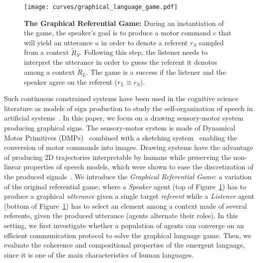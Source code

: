 \begin{figure}[h!]
\centering 
\texttt{[image: curves/graphical\_language\_game.pdf]}
\caption{\textbf{The Graphical Referential Game:} During an instantiation of the game, the speaker's goal is to produce a motor command $c$ that will yield an utterance $u$ in order to denote a referent $r_S$ sampled from a context $\tilde{R}_S$. Following this step, the listener needs to interpret the utterance in order to guess the referent it denotes among a context $\tilde{R}_L$. The game is a success if the listener and the speaker agree on the referent ($r_L\equiv r_S$).}%
\label{fig:1}
\end{figure}

Such continuous constrained systems have been used in the cognitive science literature as models of sign production to study the self-organization of speech in artificial systems~\citep{deBoer2000selforganization,oudeyer2006selforganization,MOULINFRIER20155}. 
In this paper, we focus on a drawing sensory-motor system producing graphical signs. The sensory-motor system is made of Dynamical Motor Primitives (DMPs)~\citep{schaal2006dynamic} combined with a sketching system~\citep{Mihai2021DifferentiableDA} enabling the conversion of motor commands into images.  Drawing systems have the advantage of producing 2D trajectories interpretable by humans while preserving the non-linear properties of speech models, which were shown to ease the discretization of the produced signals~\citep{STEVENS19893,MOULINFRIER20155}. We introduce the \textit{Graphical Referential Game}: a variation of the original referential game, where a \textit{Speaker} agent (top of Figure~\ref{fig:1}) has to produce a graphical \textit{utterance} given a single target \textit{referent} while a \textit{Listener} agent (bottom of Figure~\ref{fig:1}) has to select an element among a context made of several referents, given the produced utterance (agents alternate their roles).  In this setting, we first investigate whether a population of agents can converge on an efficient communication protocol to solve the graphical language game. Then, we evaluate the coherence and compositional properties of the emergent language, since it is one of the main characteristics of human languages.

